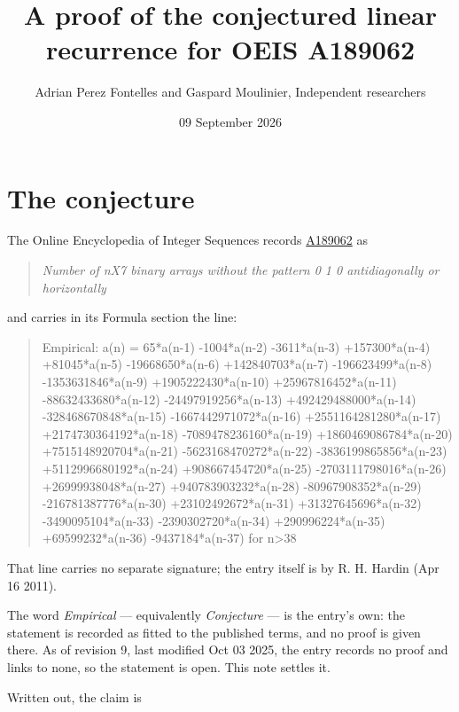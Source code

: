 \documentclass[11pt]{article}
\title{A proof of the conjectured linear recurrence for OEIS A189062}
\author{Adrian Perez Fontelles and Gaspard Moulinier, Independent researchers}
\date{09 September 2026}
\theoremstyle{definition}
\begin{document}
\maketitle
\section{The conjecture}

The Online Encyclopedia of Integer Sequences records \href{https://oeis.org/A189062}{A189062} as

\begin{quote}\itshape Number of nX7 binary arrays without the pattern 0 1 0 antidiagonally or horizontally\end{quote}

and carries in its Formula section the line:

\begin{quote}\ttfamily Empirical: a(n) = 65*a(n-1) -1004*a(n-2) -3611*a(n-3) +157300*a(n-4) +81045*a(n-5) -19668650*a(n-6) +142840703*a(n-7) -196623499*a(n-8) -1353631846*a(n-9) +1905222430*a(n-10) +25967816452*a(n-11) -88632433680*a(n-12) -24497919256*a(n-13) +492429488000*a(n-14) -328468670848*a(n-15) -1667442971072*a(n-16) +2551164281280*a(n-17) +2174730364192*a(n-18) -7089478236160*a(n-19) +1860469086784*a(n-20) +7515148920704*a(n-21) -5623168470272*a(n-22) -3836199865856*a(n-23) +5112996680192*a(n-24) +908667454720*a(n-25) -2703111798016*a(n-26) +26999938048*a(n-27) +940783903232*a(n-28) -80967908352*a(n-29) -216781387776*a(n-30) +23102492672*a(n-31) +31327645696*a(n-32) -3490095104*a(n-33) -2390302720*a(n-34) +290996224*a(n-35) +69599232*a(n-36) -9437184*a(n-37) for n>38\end{quote}

That line carries no separate signature; the entry itself is by R. H. Hardin (Apr 16 2011).

The word {\itshape Empirical} --- equivalently {\itshape Conjecture} --- is the entry's own: the statement is recorded as fitted to the published terms, and no proof is given there. As of revision 9, last modified Oct 03 2025, the entry records no proof and links to none, so the statement is open. This note settles it.

Written out, the claim is
\end{document}
